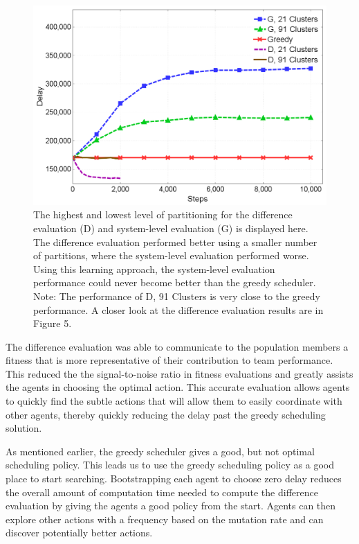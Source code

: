 \documentclass{sig-alternate}
\begin{document}
\begin{figure}[tbh!]
\centering
\includegraphics[width=1.0\columnwidth]{ClusterRewardsGreedyGEvo}
\caption{The highest and lowest level of partitioning for the difference evaluation (D) and system-level evaluation (G) is displayed here. The difference evaluation performed better using a smaller number of partitions, where the system-level evaluation performed worse. Using this learning approach, the system-level evaluation performance could never become better than the greedy scheduler. Note: The performance of D, 91 Clusters is very close to the greedy performance. A closer look at the difference evaluation results are in Figure 5.}
\label{ClusterRewardsGreedyG}
\end{figure}

The difference evaluation was able to communicate to the population members a fitness that is more representative of their contribution to team performance. This reduced the the signal-to-noise ratio in fitness evaluations and greatly assists the agents in choosing the optimal action. This accurate evaluation allows agents to quickly find the subtle actions that will allow them to easily coordinate with other agents, thereby quickly reducing the delay past the greedy scheduling solution. 

As mentioned earlier, the greedy scheduler gives a good, but not optimal scheduling policy. This leads us to use the greedy scheduling policy as a good place to start searching. Bootstrapping each agent to choose zero delay reduces the overall amount of computation time needed to compute the difference evaluation by giving the agents a good policy from the start. Agents can then explore other actions with a frequency based on the mutation rate and can discover potentially better actions.
\end{document}
